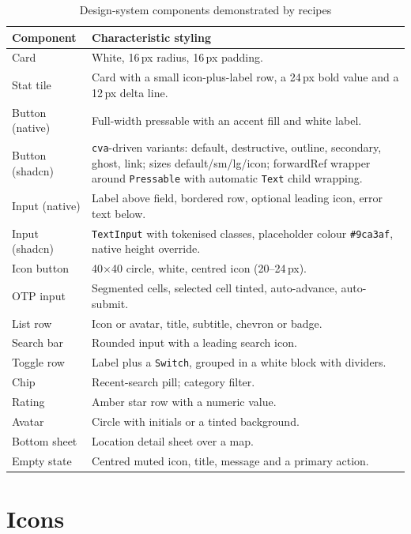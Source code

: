 \begin{longtable}{p{3.6cm}p{10.6cm}}
\caption{Design-system components demonstrated by recipes}\\
\toprule
\textbf{Component} & \textbf{Characteristic styling} \\
\midrule

Card & White, 16\,px radius, 16\,px padding. \\
Stat tile & Card with a small icon-plus-label row, a 24\,px bold value and a 12\,px
delta line. \\
Button (native) & Full-width pressable with an accent fill and white label. \\
Button (shadcn) & \texttt{cva}-driven variants: default, destructive, outline,
secondary, ghost, link; sizes default/sm/lg/icon; forwardRef wrapper around
\texttt{Pressable} with automatic \texttt{Text} child wrapping. \\
Input (native) & Label above field, bordered row, optional leading icon, error text
below. \\
Input (shadcn) & \texttt{TextInput} with tokenised classes, placeholder colour
\texttt{\#9ca3af}, native height override. \\
Icon button & 40$\times$40 circle, white, centred icon (20--24\,px). \\
OTP input & Segmented cells, selected cell tinted, auto-advance, auto-submit. \\
List row & Icon or avatar, title, subtitle, chevron or badge. \\
Search bar & Rounded input with a leading search icon. \\
Toggle row & Label plus a \texttt{Switch}, grouped in a white block with dividers. \\
Chip & Recent-search pill; category filter. \\
Rating & Amber star row with a numeric value. \\
Avatar & Circle with initials or a tinted background. \\
Bottom sheet & Location detail sheet over a map. \\
Empty state & Centred muted icon, title, message and a primary action. \\
\bottomrule
\end{longtable}

\section{Icons}


